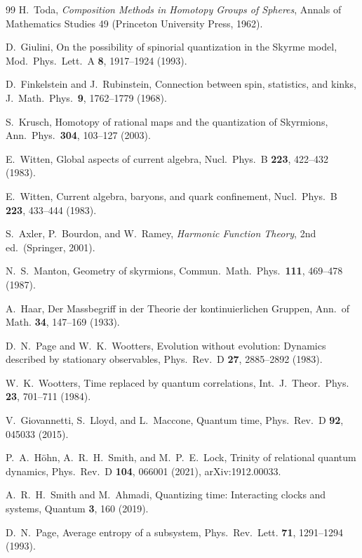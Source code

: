 \documentclass[aps,pra,onecolumn,superscriptaddress,nofootinbib,10pt]{revtex4-2}
\theoremstyle{definition}
\theoremstyle{remark}
\begin{document}
\begin{thebibliography}{99}
 H.~Toda, \emph{Composition Methods in Homotopy Groups of Spheres}, Annals of Mathematics Studies 49 (Princeton University Press, 1962).

 D.~Giulini, On the possibility of spinorial quantization in the Skyrme model, Mod.\ Phys.\ Lett.\ A \textbf{8}, 1917--1924 (1993).

 D.~Finkelstein and J.~Rubinstein, Connection between spin, statistics, and kinks, J.\ Math.\ Phys.\ \textbf{9}, 1762--1779 (1968).

 S.~Krusch, Homotopy of rational maps and the quantization of Skyrmions, Ann.\ Phys.\ \textbf{304}, 103--127 (2003).

 E.~Witten, Global aspects of current algebra, Nucl.\ Phys.\ B \textbf{223}, 422--432 (1983).

 E.~Witten, Current algebra, baryons, and quark confinement, Nucl.\ Phys.\ B \textbf{223}, 433--444 (1983).

 S.~Axler, P.~Bourdon, and W.~Ramey, \emph{Harmonic Function Theory}, 2nd ed.\ (Springer, 2001).

 N.~S.~Manton, Geometry of skyrmions, Commun.\ Math.\ Phys.\ \textbf{111}, 469--478 (1987).

 A.~Haar, Der Massbegriff in der Theorie der kontinuierlichen Gruppen, Ann.\ of Math. \textbf{34}, 147--169 (1933).

 D.~N.~Page and W.~K.~Wootters, Evolution without evolution: Dynamics described by stationary observables, Phys.\ Rev.\ D \textbf{27}, 2885--2892 (1983).

 W.~K.~Wootters, Time replaced by quantum correlations, Int.\ J.\ Theor.\ Phys. \textbf{23}, 701--711 (1984).

 V.~Giovannetti, S.~Lloyd, and L.~Maccone, Quantum time, Phys.\ Rev.\ D \textbf{92}, 045033 (2015).

 P.~A.~H\"ohn, A.~R.~H.~Smith, and M.~P.~E.~Lock, Trinity of relational quantum dynamics, Phys.\ Rev.\ D \textbf{104}, 066001 (2021), arXiv:1912.00033.

 A.~R.~H.~Smith and M.~Ahmadi, Quantizing time: Interacting clocks and systems, Quantum \textbf{3}, 160 (2019).

 D.~N.~Page, Average entropy of a subsystem, Phys.\ Rev.\ Lett. \textbf{71}, 1291--1294 (1993).


\end{thebibliography}
\end{document}

